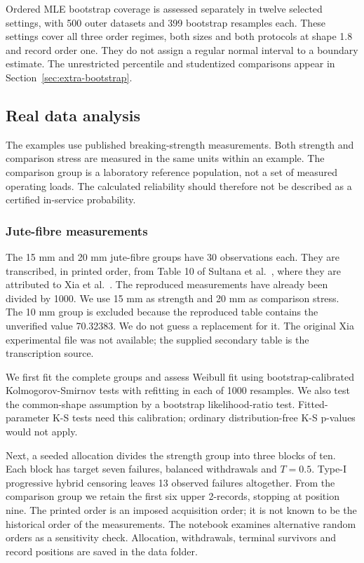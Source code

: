 \documentclass[a4paper,11pt]{article}
\begin{document}



Ordered MLE bootstrap coverage is assessed separately in twelve selected settings, with 500 outer datasets and 399 bootstrap resamples each. These settings cover all three order regimes, both sizes and both protocols at shape 1.8 and record order one. They do not assign a regular normal interval to a boundary estimate. The unrestricted percentile and studentized comparisons appear in Section~\ref{sec:extra-bootstrap}.


\subsection{Real data analysis}\label{sec:data}
The examples use published breaking-strength measurements. Both strength and comparison stress are measured in the same units within an example. The comparison group is a laboratory reference population, not a set of measured operating loads. The calculated reliability should therefore not be described as a certified in-service probability.



\subsubsection{Jute-fibre measurements}
The 15 mm and 20 mm jute-fibre groups have 30 observations each. They are transcribed, in printed order, from Table 10 of Sultana et al.\ \cite{Sultana2026}, where they are attributed to Xia et al.\ \cite{Xia2009}. The reproduced measurements have already been divided by 1000. We use 15 mm as strength and 20 mm as comparison stress. The 10 mm group is excluded because the reproduced table contains the unverified value 70.32383. We do not guess a replacement for it. The original Xia experimental file was not available; the supplied secondary table is the transcription source.

We first fit the complete groups and assess Weibull fit using bootstrap-calibrated Kolmogorov-Smirnov tests with refitting in each of 1000 resamples. We also test the common-shape assumption by a bootstrap likelihood-ratio test. Fitted-parameter K-S tests need this calibration; ordinary distribution-free K-S p-values would not apply.



Next, a seeded allocation divides the strength group into three blocks of ten. Each block has target seven failures, balanced withdrawals and $T=0.5$. Type-I progressive hybrid censoring leaves 13 observed failures altogether. From the comparison group we retain the first six upper 2-records, stopping at position nine. The printed order is an imposed acquisition order; it is not known to be the historical order of the measurements. The notebook examines alternative random orders as a sensitivity check. Allocation, withdrawals, terminal survivors and record positions are saved in the data folder.
\end{document}
